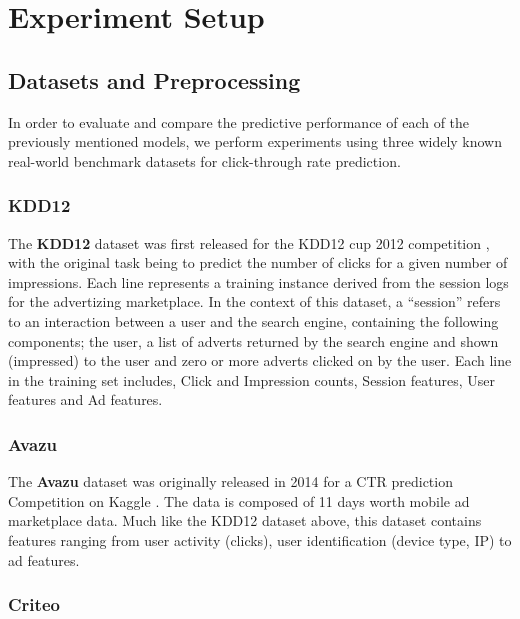 \documentclass{mldsmsc}
\begin{document}
\section{Experiment Setup}
\label{sec:experiment-setup}

\subsection{Datasets and Preprocessing}

In order to evaluate and compare the predictive performance of each of the previously mentioned
models, we perform experiments using three widely known real-world benchmark datasets for
click-through rate prediction.

\subsubsection{KDD12}

The \textbf{KDD12} dataset was first released for the KDD12 cup 2012 competition
\citep{RefWorks:aden2012kdd}, with the original task being to predict the 
number of clicks for a given number of impressions. Each line represents 
a training instance derived from the session logs for the advertizing 
marketplace. In the context of this dataset, a ``session'' refers to an 
interaction between a user and the search engine, containing the following 
components; the user, a list of adverts returned by the search engine and 
shown (impressed) to the user and zero or more adverts clicked on by the 
user. Each line in the training set includes, Click and Impression counts, 
Session features, User features and Ad features.

\subsubsection{Avazu}

The \textbf{Avazu} dataset was originally released in 2014 for a CTR prediction 
Competition on Kaggle \citep{RefWorks:wang2014click-through}. The data is 
composed of 11 days worth mobile ad marketplace data. Much like the KDD12 
dataset above, this dataset contains features ranging from user activity 
(clicks), user identification (device type, IP) to ad features.

\subsubsection{Criteo}
\end{document}
